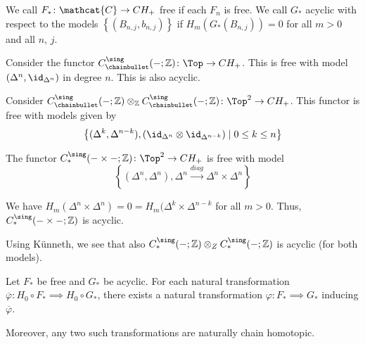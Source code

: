 \begin{definition}
  We call $F_* \colon  \mathcat{C} \to  CH_+$ free if each $F_n$ is free.
  We call  $G_*$ acyclic with respect to the models
   $\left\{(B_{n,j}, b_{n,j})\right\} $ 
   if $H_m(G_*(B_{n,j})) = 0$ for all $m>0$ and all $n$,  $j$.
\end{definition}

\begin{example}
  Consider the functor
  $C_\chainbullet ^{\sing}(\blank ; \mathbb{Z})\colon \Top \to CH_+$.
  This is free with model $(\Delta^n, \id_{\Delta^n})$ in degree $n$.
  This is also acyclic.
\end{example}

\begin{example}
  Consider
  $C_\chainbullet ^{\sing}(\blank ; \mathbb{Z}) \otimes _{\mathbb{Z}} C_\chainbullet ^{\sing}
  (\blank ; \mathbb{Z}) \colon  \Top^2 \to  CH_+$.
  This functor is free with models given by
  \[
    \left\{(\Delta^k, \Delta^{n-k}), (\id_{\Delta^n} \otimes \id_{\Delta^{n-k}}) 
    \mid  0 \leq  k \leq  n\right\} 
  \]

  The functor $C_*^{\sing}(\blank \times  \blank ; \mathbb{Z}) \colon  \Top^2\to CH_+$
  is free with model
  \[
    \left\{(\Delta^n, \Delta^n), \Delta^n \xrightarrow{diag} \Delta^n \times \Delta^n \right\} 
  \]

  We have $H_m(\Delta^n \times \Delta^n) = 0 = H_m(\Delta^k \times \Delta^{n-k}$ 
  for all $m>0$.
  Thus,  $C_*^{\sing}(- \times - ; \mathbb{Z})$ is acyclic.

  Using Künneth, we see that also
  $C_*^{\sing}( \blank ; \mathbb{Z}) \otimes _Z C_*^{\sing} (\blank ; \mathbb{Z})$ 
  is acyclic (for both models).
\end{example}

\begin{theorem}
  Let $F_*$ be free and  $G_*$ be acyclic.
  For each natural transformation
  $\overline{\varphi } \colon  H_0 \circ  F_*
  \implies H_0 \circ  G_*$,
  there exists a natural transformation $\varphi \colon F_* \implies G_*$
  inducing $\overline{\varphi }$.

  Moreover, any two such transformations are naturally chain homotopic.
\end{theorem}



